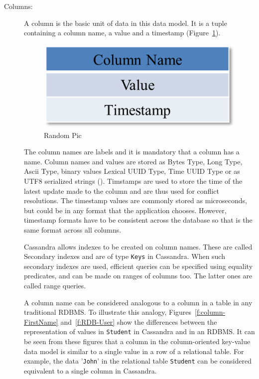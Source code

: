 \begin{description}
\item[Columns:]  A column is the basic unit of data in this data model.  It is a
tuple containing a column name,   a value and a timestamp (Figure~\ref{f:column}). 

\begin{figure}[h]
	\centering
	\includegraphics[width=.4\textwidth]{./figure/Example/Column.png}
	\caption{Random Pic}\label{f:column}
\end{figure}

The column names are labels  and it is mandatory that a column has a
name.  Column names and values are stored as Bytes Type,   Long Type,  
Ascii Type,   binary values Lexical UUID Type,   Time UUID Type or as UTF8
serialized strings ().  Timstamps are used to store the time of the
latest update made to the column and are thus used for conflict resolutions.  The
timestamp values are commonly stored as microseconds,   but could be in any format
that the application chooses.  However,   timestamp formats have to be consistent
across the database so that is the same format across all columns. 

Cassandra allows indexes to be created on column names.  These are called
Secondary indexes and are of type \texttt{Keys} in Cassandra.  When such secondary indexes
are used,   efficient queries can be specified using equality predicates,   and
can be made on ranges of columns too.  The latter ones are called range queries. 

A column name can be considered analogous to a column
in a table in any traditional \ac{RDBMS}.  To illustrate this analogy,
Figures~\ref{f:column-FirstName} and~\ref{f:RDB-User} show the differences
between the representation of values in \texttt{Student} in Cassandra and in an
\ac{RDBMS}.
It can be seen from these figures that a column in the column-oriented key-value
data model is similar to a single value in a row of a relational table.  For
example,   the data '\texttt{John}' in the relational table \texttt{Student} can
be considered equivalent to a single column in Cassandra.


\end{description}
